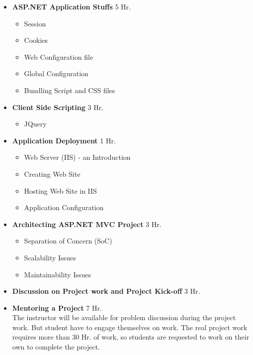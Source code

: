\documentclass[12pt,a4paper]{article}
\begin{document}
\begin{itemize}
\begin{itemize}
    \end{itemize}

    \item \textbf{ASP.NET Application Stuffs} \hfill 5 Hr.
    \begin{itemize}        
        \item Session
        \item Cookies
        \item Web Configuration file
        \item Global Configuration
        \item Bundling Script and CSS files 
    \end{itemize}

    \item \textbf{Client Side Scripting} \hfill 3 Hr.
    \begin{itemize}        
        \item JQuery
    \end{itemize}


    \item \textbf{Application Deployment} \hfill 1 Hr.
    \begin{itemize}        
        \item Web Server (IIS) - an Introduction
        \item Creating Web Site
        \item Hosting Web Site in IIS 
        \item Application Configuration
    \end{itemize}

    \item \textbf{Architecting ASP.NET MVC Project} \hfill 3 Hr.
    \begin{itemize}        
        \item Separation of Concern (SoC)
        \item Scalability Issues
        \item Maintainability Issues
    \end{itemize}

    \item \textbf{Discussion on Project work and Project Kick-off}   \hfill 3 Hr.

    \item \textbf{Mentoring a Project} \hfill 7 Hr.\\
            The instructor will be available for problem discussion during the project work. But student have to engage themselves on work.     The real project work requires more than 30 Hr. of work, so students are requested to work on their own to complete the project.
\end{itemize}
\end{document}
